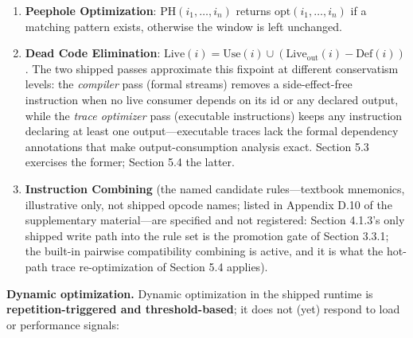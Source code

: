 \documentclass[
  sigconf,
  anonymous]{acmart}
\begin{document}
\begin{enumerate}
\def\labelenumi{\arabic{enumi}.}
\item
  \textbf{Peephole Optimization}: \(\text{PH}(i_1, \dots, i_n)\) returns
  \(\text{opt}(i_1, \dots, i_n)\) if a matching pattern exists,
  otherwise the window is left unchanged.
\item
  \textbf{Dead Code Elimination}:
  \(\text{Live}(i) = \text{Use}(i) \cup (\text{Live}_{\text{out}}(i) - \text{Def}(i))\).
  The two shipped passes approximate this fixpoint at different
  conservatism levels: the \emph{compiler} pass (formal streams) removes
  a side-effect-free instruction when no live consumer depends on its id
  or any declared output, while the \emph{trace optimizer} pass
  (executable instructions) keeps any instruction declaring at least one
  output---executable traces lack the formal dependency annotations that
  make output-consumption analysis exact. Section 5.3 exercises the
  former; Section 5.4 the latter.
\item
  \textbf{Instruction Combining} (the named candidate rules---textbook
  mnemonics, illustrative only, not shipped opcode names; listed in
  Appendix D.10 of the supplementary material---are specified and not
  registered: Section 4.1.3's only shipped write path into the rule set
  is the promotion gate of Section 3.3.1; the built-in pairwise
  compatibility combining is active, and it is what the hot-path trace
  re-optimization of Section 5.4 applies).
\end{enumerate}

\textbf{Dynamic optimization.} Dynamic optimization in the shipped
runtime is \textbf{repetition-triggered and threshold-based}; it does
not (yet) respond to load or performance signals:
\end{document}
